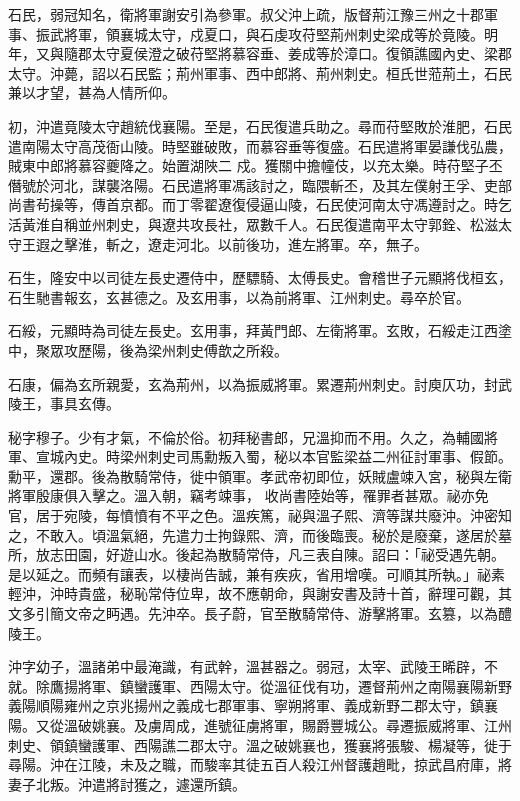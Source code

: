 \begin{pinyinscope}
 石民，弱冠知名，衛將軍謝安引為參軍。叔父沖上疏，版督荊江豫三州之十郡軍事、振武將軍，領襄城太守，戍夏口，與石虔攻苻堅荊州刺史梁成等於竟陵。明年，又與隨郡太守夏侯澄之破苻堅將慕容垂、姜成等於漳口。復領譙國內史、梁郡太守。沖薨，詔以石民監；荊州軍事、西中郎將、荊州刺史。桓氏世蒞荊土，石民兼以才望，甚為人情所仰。



 初，沖遣竟陵太守趙統伐襄陽。至是，石民復遣兵助之。尋而苻堅敗於淮肥，石民遣南陽太守高茂衙山陵。時堅雖破敗，而慕容垂等復盛。石民遣將軍晏謙伐弘農，賊東中郎將慕容夔降之。始置湖陜二
 戍。獲關中擔幢伎，以充太樂。時苻堅子丕僭號於河北，謀襲洛陽。石民遣將軍馮該討之，臨隈斬丕，及其左僕射王孚、吏部尚書茍操等，傳首京都。而丁零翟遼復侵逼山陵，石民使河南太守馮遵討之。時乞活黃淮自稱並州刺史，與遼共攻長社，眾數千人。石民復遣南平太守郭銓、松滋太守王遐之擊淮，斬之，遼走河北。以前後功，進左將軍。卒，無子。



 石生，隆安中以司徒左長史遷侍中，歷驃騎、太傅長史。會稽世子元顯將伐桓玄，石生馳書報玄，玄甚德之。及玄用事，以為前將軍、江州刺史。尋卒於官。



 石綏，元顯時為司徒左長史。玄用事，拜黃門郎、左衛將軍。玄敗，石綏走江西塗中，聚眾攻歷陽，後為梁州刺史傅歆之所殺。



 石康，偏為玄所親愛，玄為荊州，以為振威將軍。累遷荊州刺史。討庾仄功，封武陵王，事具玄傳。



 秘字穆子。少有才氣，不倫於俗。初拜秘書郎，兄溫抑而不用。久之，為輔國將軍、宣城內史。時梁州刺史司馬勳叛入蜀，秘以本官監梁益二州征討軍事、假節。勳平，還郡。後為散騎常侍，徙中領軍。孝武帝初即位，妖賊盧竦入宮，秘與左衛將軍殷康俱入擊之。溫入朝，竊考竦事，
 收尚書陸始等，罹罪者甚眾。祕亦免官，居于宛陵，每憤憤有不平之色。溫疾篤，祕與溫子熙、濟等謀共廢沖。沖密知之，不敢入。頃溫氣絕，先遣力士拘錄熙、濟，而後臨喪。秘於是廢棄，遂居於墓所，放志田園，好遊山水。後起為散騎常侍，凡三表自陳。詔曰：「祕受遇先朝。是以延之。而頻有讓表，以棲尚告誠，兼有疾疢，省用增嘆。可順其所執。」祕素輕沖，沖時貴盛，秘恥常侍位卑，故不應朝命，與謝安書及詩十首，辭理可觀，其文多引簡文帝之眄遇。先沖卒。長子蔚，官至散騎常侍、游擊將軍。玄篡，以為醴陵王。



 沖字幼子，溫諸弟中最淹識，有武幹，溫甚器之。弱冠，太宰、武陵王晞辟，不就。除鷹揚將軍、鎮蠻護軍、西陽太守。從溫征伐有功，遷督荊州之南陽襄陽新野義陽順陽雍州之京兆揚州之義成七郡軍事、寧朔將軍、義成新野二郡太守，鎮襄陽。又從溫破姚襄。及虜周成，進號征虜將軍，賜爵豐城公。尋遷振威將軍、江州刺史、領鎮蠻護軍、西陽譙二郡太守。溫之破姚襄也，獲襄將張駿、楊凝等，徙于尋陽。沖在江陵，未及之職，而駿率其徒五百人殺江州督護趙毗，掠武昌府庫，將妻子北叛。沖遣將討獲之，遽還所鎮。




\end{pinyinscope}
